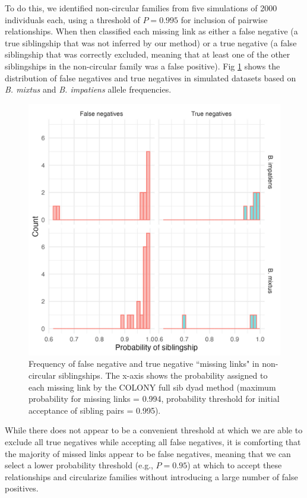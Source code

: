 \documentclass[12pt]{article}
\begin{document}
To do this, we identified non-circular families from five simulations of 2000 individuals each, using a threshold of $P = 0.995$ for inclusion of pairwise relationships. When then classified each missing link as either a false negative (a true siblingship that was not inferred by our method) or a true negative (a false siblingship that was correctly excluded, meaning that at least one of the other siblingships in the non-circular family was a false positive). Fig \ref{fig:noncircularity} shows the distribution of false negatives and true negatives in simulated datasets based on \emph{B. mixtus} and \emph{B. impatiens} allele frequencies.

\begin{figure}[H]
    \centering
    \includegraphics[width=\linewidth]{appendix_figures/noncircularity.jpg}
    \caption{Frequency of false negative and true negative ``missing links" in non-circular siblingships. The x-axis shows the probability assigned to each missing link by the COLONY full sib dyad method (maximum probability for missing links = 0.994, probability threshold for initial acceptance of sibling pairs = 0.995).}
    \label{fig:noncircularity}
\end{figure}

While there does not appear to be a convenient threshold at which we are able to exclude all true negatives while accepting all false negatives, it is comforting that the majority of missed links appear to be false negatives, meaning that we can select a lower probability threshold (e.g., $P = 0.95$) at which to accept these relationships and circularize families without introducing a large number of false positives.
\end{document}

